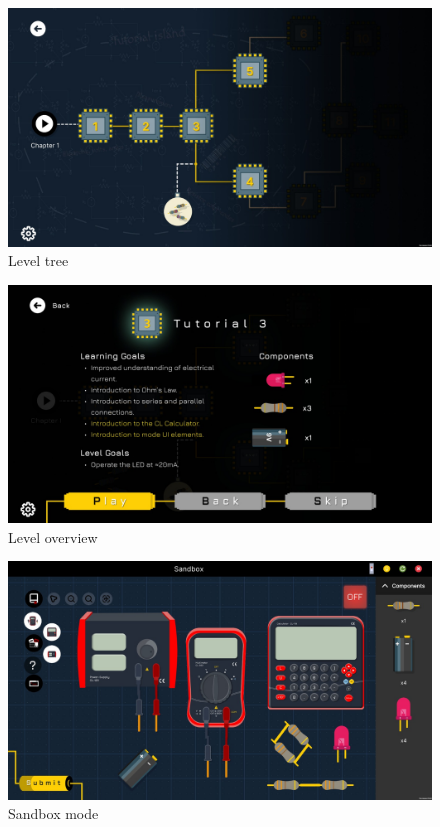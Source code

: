 \documentclass[../main.tex]{subfiles}
\begin{document}
\begin{figure}[!ht]
    \centering
    \includegraphics[scale=0.3]{images/chapter5/level_tree.jpeg}
    \caption{Level tree}
    \label{level_tree}
\end{figure}

\begin{figure}[!ht]
    \centering
    \includegraphics[scale=0.3]{images/chapter5/level_overview.jpeg}
    \caption{Level overview}
    \label{level_overview}
\end{figure}

\begin{figure}[!ht]
    \centering
    \includegraphics[scale=0.3]{images/chapter5/sandbox.jpeg}
    \caption{Sandbox mode}
    \label{sandbox}
\end{figure}
\end{document}

